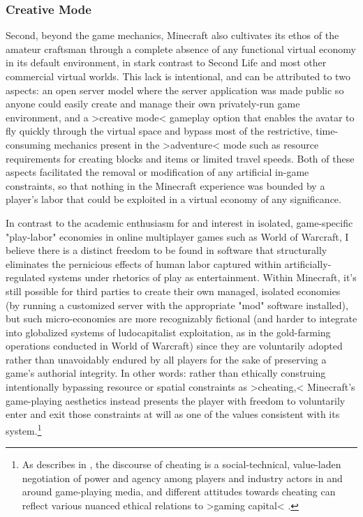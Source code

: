 \subsubsection*{Creative Mode}
Second, beyond the game mechanics, Minecraft also cultivates its ethos of the amateur craftsman through a complete absence of any functional virtual economy in its default environment, in stark contrast to Second Life and most other commercial virtual worlds. This lack is intentional, and can be attributed to two aspects: an open server model where the server application was made public so anyone could easily create and manage their own privately-run game environment, and a >creative mode< gameplay option that enables the avatar to fly quickly through the virtual space and bypass most of the restrictive, time-consuming mechanics present in the >adventure< mode such as resource requirements for creating blocks and items or limited travel speeds. Both of these aspects facilitated the removal or modification of any artificial in-game constraints, so that nothing in the Minecraft experience was bounded by a player's labor that could be exploited in a virtual economy of any significance.

In contrast to the academic enthusiasm for and interest in isolated, game-specific "play-labor" economies in online multiplayer games such as World of Warcraft, I believe there is a distinct freedom to be found in software that structurally eliminates the pernicious effects of human labor captured within artificially-regulated systems under rhetorics of play as entertainment. Within Minecraft, it's still possible for third parties to create their own managed, isolated economies (by running a customized server with the appropriate "mod" software installed), but such micro-economies are more recognizably fictional (and harder to integrate into globalized systems of ludocapitalist exploitation, as in the gold-farming operations conducted in World of Warcraft) since they are voluntarily adopted rather than unavoidably endured by all players for the sake of preserving a game's authorial integrity. In other words: rather than ethically construing intentionally bypassing resource or spatial constraints as >cheating,< Minecraft's game-playing aesthetics instead presents the player with freedom to voluntarily enter and exit those constraints at will as one of the values consistent with its system.\footnote{
  As \citeauthor{Consalvo2007-yx} describes in , the discourse of cheating is a social-technical, value-laden negotiation of power and agency among players and industry actors in and around game-playing media, and different attitudes towards cheating can reflect various nuanced ethical relations to >gaming capital< \autocite[2]{Consalvo2007-yx}.
  }

